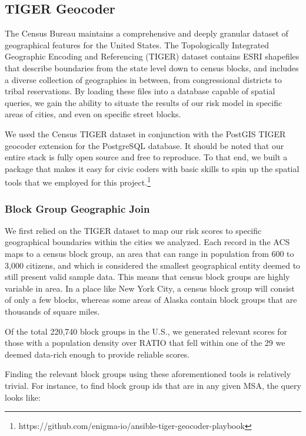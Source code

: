 \documentclass{sig-alternate}
\begin{document}
\subsection{TIGER Geocoder}

The Census Bureau maintains a comprehensive and deeply granular dataset of geographical features for the United States. The Topologically Integrated Geographic Encoding and Referencing (TIGER) dataset contains ESRI shapefiles that describe boundaries from the state level down to census blocks, and includes a diverse collection of geographies in between, from congressional districts to tribal reservations. By loading these files into a database capable of spatial queries, we gain the ability to situate the results of our risk model in specific areas of cities, and even on specific street blocks.

We used the Census TIGER dataset in conjunction with the PostGIS TIGER geocoder extension for the PostgreSQL database. It should be noted that our entire stack is fully open source and free to reproduce. To that end, we built a package that makes it easy for civic coders with basic skills to spin up the spatial tools that we employed for this project.\footnote{https://github.com/enigma-io/ansible-tiger-geocoder-playbook} 

\subsubsection{Block Group Geographic Join}

We first relied on the TIGER dataset to map our risk scores to specific geographical boundaries within the cities we analyzed. Each record in the ACS maps to a census block group, an area that can range in population from 600 to 3,000 citizens, and which is considered the smallest geographical entity deemed to still present valid sample data. This means that census block groups are highly variable in area. In a place like New York City, a census block group will consist of only a few blocks, whereas some areas of Alaska contain block groups that are thousands of square miles.

Of the total 220,740 block groups in the U.S., we generated relevant scores for those with a population density over RATIO that fell within one of the 29 we deemed data-rich enough to provide reliable scores.

Finding the relevant block groups using these aforementioned tools is relatively trivial. For instance, to find block group ids that are in any given MSA, the query looks like:
\end{document}

